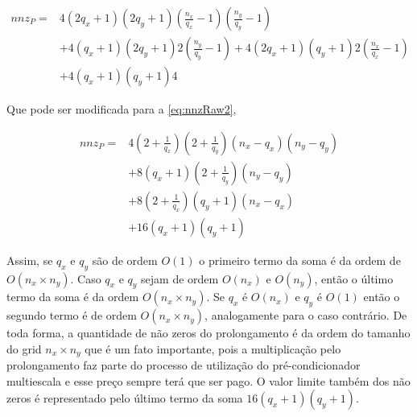 \begin{equation} \label{eq:nnzRaw}
\begin{aligned}
    nnz_P = & 4(2q_x+1)(2q_y+1)  (\frac{n_x}{q_x} - 1) (\frac{n_y}{q_y} - 1)   \\ 
            & + 4 (q_x+1)(2q_y+1)  2 ( \frac{n_y}{q_y} - 1) +  4 (2q_x+1)(q_y+1)  2 (\frac{n_x}{q_x} - 1) \\
            & +  4(q_x+1)(q_y+1) 4 
\end{aligned}
\end{equation}

Que pode ser modificada para a \eqref{eq:nnzRaw2},

\begin{equation} \label{eq:nnzRaw2}
\begin{aligned}
    nnz_P = &   4 (2+\frac{1}{q_x})(2 + \frac{1}{q_y})  (n_x - q_x) (n_y - q_y) \\ 
            & + 8 (q_x+1)(2 + \frac{1}{q_y})  (n_y - q_y) \\
            & + 8 (2+\frac{1}{q_x})(q_y+1) (n_x - q_x) \\
            & + 16 (q_x+1)(q_y+1)  
\end{aligned}
\end{equation}

Assim, se $q_x$ e $q_y$ são de ordem $O(1)$ o primeiro termo da soma é da ordem de $O(n_x \times n_y)$. Caso $q_x$ e $q_y$ sejam de ordem $O(n_x)$ e $O(n_y)$, então o último termo da soma é da ordem $O(n_x \times n_y )$. 
Se $q_x$ é $O(n_x)$ e $q_y$ é $O(1)$ então o segundo termo é de ordem $O(n_x \times n_y)$, analogamente para o caso contrário.
De toda forma, a quantidade de não zeros do prolongamento é da ordem do tamanho do grid $n_x \times n_y$ que é um fato importante, pois a multiplicação pelo prolongamento faz parte do processo de utilização do pré-condicionador multiescala e esse preço sempre terá que ser pago. O valor limite também dos não zeros é representado pelo último termo da soma $16(q_x+1)(q_y+1)$. 

